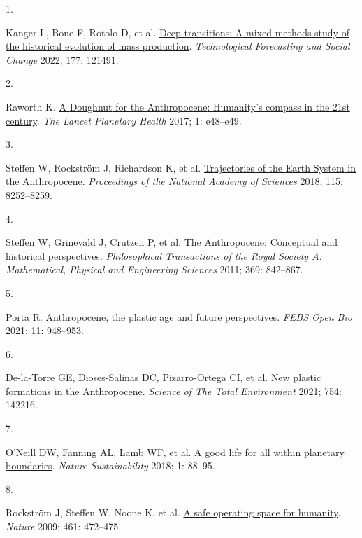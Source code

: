 \documentclass[
  12pt,
  a4paperpaper,
  onecolumn]{article}
\newlength{\cslhangindent}
\newlength{\csllabelwidth}
\newlength{\cslentryspacingunit} %
\newenvironment{CSLReferences}[2] %
 {%
  \setlength{\parindent}{0pt}
  \ifodd #1
  \let\oldpar\par
  \def\par{\hangindent=\cslhangindent\oldpar}
  \fi
  \setlength{\parskip}{#2\cslentryspacingunit}
 }%
 {}
\newcommand{\CSLLeftMargin}[1]{\parbox[t]{\csllabelwidth}{#1}}
\newcommand{\CSLRightInline}[1]{\parbox[t]{\linewidth - \csllabelwidth}{#1}\break}
\begin{document}
\hypertarget{refs}{}
\begin{CSLReferences}{0}{0}
\leavevmode{}%
\CSLLeftMargin{1. }%
\CSLRightInline{Kanger L, Bone F, Rotolo D, et al.
\href{https://doi.org/10.1016/j.techfore.2022.121491}{Deep transitions:
{A} mixed methods study of the historical evolution of mass production}.
\emph{Technological Forecasting and Social Change} 2022; 177: 121491.}

\leavevmode{}%
\CSLLeftMargin{2. }%
\CSLRightInline{Raworth K.
\href{https://doi.org/10.1016/S2542-5196(17)30028-1}{A {Doughnut} for
the {Anthropocene}: Humanity's compass in the 21st century}. \emph{The
Lancet Planetary Health} 2017; 1: e48--e49.}

\leavevmode{}%
\CSLLeftMargin{3. }%
\CSLRightInline{Steffen W, Rockström J, Richardson K, et al.
\href{https://doi.org/10.1073/pnas.1810141115}{Trajectories of the
{Earth System} in the {Anthropocene}}. \emph{Proceedings of the National
Academy of Sciences} 2018; 115: 8252--8259.}

\leavevmode{}%
\CSLLeftMargin{4. }%
\CSLRightInline{Steffen W, Grinevald J, Crutzen P, et al.
\href{https://doi.org/10.1098/rsta.2010.0327}{The {Anthropocene}:
Conceptual and historical perspectives}. \emph{Philosophical
Transactions of the Royal Society A: Mathematical, Physical and
Engineering Sciences} 2011; 369: 842--867.}

\leavevmode{}%
\CSLLeftMargin{5. }%
\CSLRightInline{Porta R.
\href{https://doi.org/10.1002/2211-5463.13122}{Anthropocene, the plastic
age and future perspectives}. \emph{FEBS Open Bio} 2021; 11: 948--953.}

\leavevmode{}%
\CSLLeftMargin{6. }%
\CSLRightInline{De-la-Torre GE, Dioses-Salinas DC, Pizarro-Ortega CI, et
al. \href{https://doi.org/10.1016/j.scitotenv.2020.142216}{New plastic
formations in the {Anthropocene}}. \emph{Science of The Total
Environment} 2021; 754: 142216.}

\leavevmode{}%
\CSLLeftMargin{7. }%
\CSLRightInline{O'Neill DW, Fanning AL, Lamb WF, et al.
\href{https://doi.org/10.1038/s41893-018-0021-4}{A good life for all
within planetary boundaries}. \emph{Nature Sustainability} 2018; 1:
88--95.}

\leavevmode{}%
\CSLLeftMargin{8. }%
\CSLRightInline{Rockström J, Steffen W, Noone K, et al.
\href{https://doi.org/10.1038/461472a}{A safe operating space for
humanity}. \emph{Nature} 2009; 461: 472--475.}


\end{CSLReferences}
\end{document}
